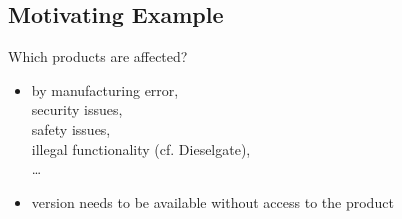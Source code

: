 \subsection{Motivating Example}
\begin{frame}{\insertsubsection}
	\begin{fancycolumns}[widths={66}]
	\nextcolumn
		\begin{example}{Which products are affected?}
			\begin{itemize}
				\item by manufacturing error,\\ security issues,\\ safety issues,\\ illegal functionality (cf. Dieselgate),\\ \ldots{}
				\item version needs to be available without access to the product
			\end{itemize}
		\end{example}
	\end{fancycolumns}
\end{frame}

